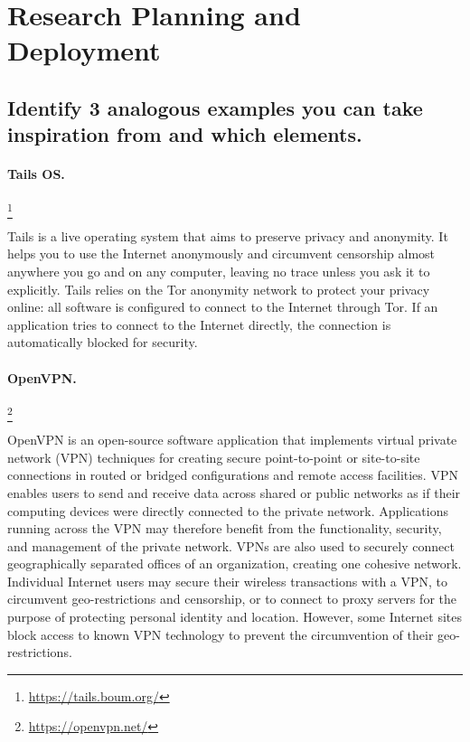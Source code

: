\section{Research Planning and Deployment}
\label{sec_b}

\subsection{Identify 3 analogous examples you can take inspiration from and 
which elements.}

\paragraph{Tails OS.}
\footnote{\url{https://tails.boum.org/}}

Tails is a live  operating system that aims to preserve privacy and anonymity. 
It helps you to use the Internet anonymously and circumvent censorship almost 
anywhere you go and on any computer, leaving no trace unless you ask it to 
explicitly. Tails relies on the Tor anonymity network to protect your privacy 
online: all software is configured to connect to the Internet through Tor.
If an application tries to connect to the Internet directly, the connection is 
automatically blocked for security.

\paragraph{OpenVPN.}
\footnote{\url{https://openvpn.net/}}

OpenVPN is an open-source software application that implements virtual private 
network (VPN) techniques for creating secure point-to-point or site-to-site 
connections in routed or bridged configurations and remote access facilities.
VPN enables users to send and receive data across shared or public networks as 
if their computing devices were directly connected to the private network. 
Applications running across the VPN may therefore benefit from the functionality, 
security, and management of the private network.
VPNs are  also used to securely connect geographically separated offices of an 
organization, creating one cohesive network. Individual Internet users may 
secure their  wireless transactions with a VPN, to circumvent geo-restrictions 
and censorship, or to connect to proxy servers for the purpose of protecting 
personal identity and location. However, some Internet sites block access to 
known VPN technology to prevent the circumvention of their geo-restrictions.

